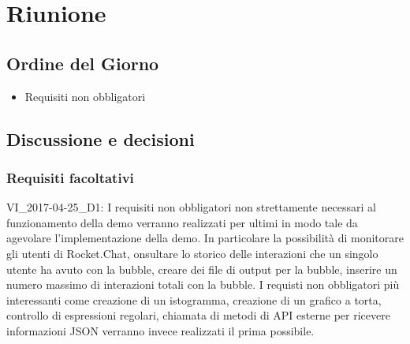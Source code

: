 \section{Riunione}
\subsection{Ordine del Giorno}
\begin{itemize}
	\item Requisiti non obbligatori
\end{itemize}

\subsection{Discussione e decisioni}

\subsubsection{Requisiti facoltativi}
VI\_2017-04-25\_D1: I requisiti non obbligatori non strettamente necessari al funzionamento della demo verranno realizzati per ultimi in modo tale da agevolare l'implementazione della demo. In particolare la possibilità di monitorare gli utenti di Rocket.Chat, onsultare lo storico delle interazioni che un singolo utente ha avuto con la bubble, creare dei file di output per la bubble, inserire un numero massimo di interazioni totali con la bubble. I requisti non obbligatori più interessanti come creazione di un istogramma, creazione di un grafico a torta, controllo di espressioni regolari, chiamata di metodi di API esterne per ricevere informazioni JSON verranno invece realizzati il prima possibile.

\clearpage
